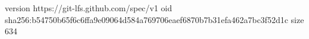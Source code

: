 version https://git-lfs.github.com/spec/v1
oid sha256:b54750b65f6c6ffa9e09064d584a769706eaef6870b7b31efa462a7bc3f52d1c
size 634
